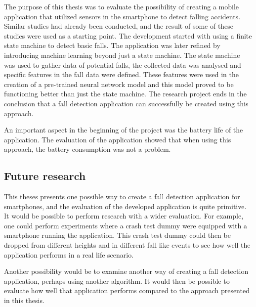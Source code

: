 \documentclass[12pt, a4paper, onecolumn]{article}
\begin{document}
	The purpose of this thesis was to evaluate the possibility of creating a mobile application that utilized sensors in the smartphone to detect falling accidents. Similar studies had already been conducted, and the result of some of these studies were used as a starting point. The development started with using a finite state machine to detect basic falls. The application was later refined by introducing machine learning beyond just a state machine. The state machine was used to gather data of potential falls, the collected data was analysed and specific features in the fall data were defined. These features were used in the creation of a pre-trained neural network model and this model proved to be functioning better than just the state machine. The research project ends in the conclusion that a fall detection application can successfully be created using this approach.
	
	An important aspect in the beginning of the project was the battery life of the application. The evaluation of the application showed that when using this approach, the battery consumption was not a problem.
	
	\subsection{Future research}
	
	This theses presents one possible way to create a fall detection application for smartphones, and the evaluation of the developed application is quite primitive. It would be possible to perform research with a wider evaluation. For example, one could perform experiments where a crash test dummy were equipped with a smartphone running the application. This crash test dummy could then be dropped from different heights and in different fall like events to see how well the application performs in a real life scenario.
	
	Another possibility would be to examine another way of creating a fall detection application, perhaps using another algorithm. It would then be possible to evaluate how well that application performs compared to the approach presented in this thesis.
	
	\newpage
		
	
	
\end{document}
